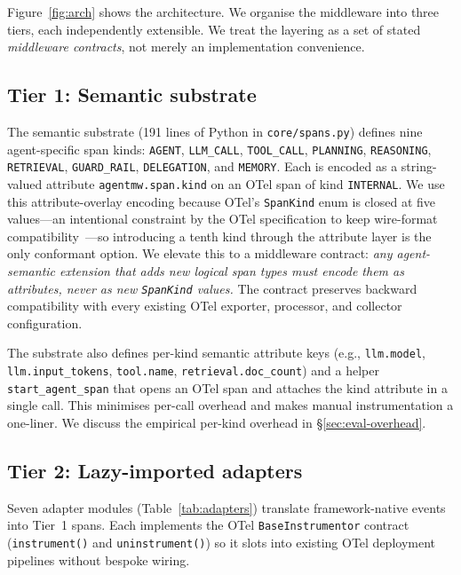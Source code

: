 \documentclass[sigconf,review,anonymous,9pt]{acmart}
\begin{document}
Figure~\ref{fig:arch} shows the architecture. We organise the
middleware into three tiers, each independently extensible. We treat
the layering as a set of stated \emph{middleware contracts}, not
merely an implementation convenience.

\subsection{Tier 1: Semantic substrate}

The semantic substrate (191 lines of Python in \texttt{core/spans.py})
defines nine agent-specific span kinds: \texttt{AGENT},
\texttt{LLM\_CALL}, \texttt{TOOL\_CALL}, \texttt{PLANNING},
\texttt{REASONING}, \texttt{RETRIEVAL}, \texttt{GUARD\_RAIL},
\texttt{DELEGATION}, and \texttt{MEMORY}. Each is encoded as a
string-valued attribute \texttt{agentmw.span.kind} on an OTel
span of kind \texttt{INTERNAL}. We use this attribute-overlay
encoding because OTel's \texttt{SpanKind} enum is closed at five
values---an intentional constraint by the OTel specification to keep
wire-format compatibility~\cite{otel}---so introducing a tenth kind
through the attribute layer is the only conformant option. We elevate
this to a middleware contract: \emph{any agent-semantic
extension that adds new logical span types must encode them as
attributes, never as new \texttt{SpanKind} values.} The contract
preserves backward compatibility with every existing OTel exporter,
processor, and collector configuration.

The substrate also defines per-kind semantic attribute keys (e.g.,
\texttt{llm.model}, \texttt{llm.input\_tokens}, \texttt{tool.name},
\texttt{retrieval.doc\_count}) and a helper
\texttt{start\_agent\_span} that opens an OTel span and attaches the
kind attribute in a single call. This minimises per-call overhead
and makes manual instrumentation a one-liner. We discuss the
empirical per-kind overhead in \S\ref{sec:eval-overhead}.

\subsection{Tier 2: Lazy-imported adapters}

Seven adapter modules (Table~\ref{tab:adapters}) translate
framework-native events into Tier~1 spans. Each implements the OTel
\texttt{BaseInstrumentor} contract (\texttt{instrument()} and
\texttt{uninstrument()}) so it slots into existing OTel deployment
pipelines without bespoke wiring.
\end{document}

